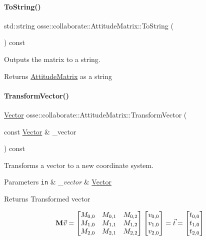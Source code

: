 \paragraph{\texorpdfstring{To\+String()}{ToString()}}
{\footnotesize\ttfamily std\+::string osse\+::collaborate\+::\+Attitude\+Matrix\+::\+To\+String (\begin{DoxyParamCaption}{ }\end{DoxyParamCaption}) const}



Outputs the matrix to a string. 

\begin{DoxyReturn}{Returns}
\hyperlink{classosse_1_1collaborate_1_1_attitude_matrix}{Attitude\+Matrix} as a string 
\end{DoxyReturn}
\mbox{\label{classosse_1_1collaborate_1_1_attitude_matrix_afc7bdadbaea2ac55fbec218ea17ce6a3}} 
\paragraph{\texorpdfstring{Transform\+Vector()}{TransformVector()}}
{\footnotesize\ttfamily \hyperlink{classosse_1_1collaborate_1_1_vector}{Vector} osse\+::collaborate\+::\+Attitude\+Matrix\+::\+Transform\+Vector (\begin{DoxyParamCaption}\item[{const \hyperlink{classosse_1_1collaborate_1_1_vector}{Vector} \&}]{\+\_\+vector }\end{DoxyParamCaption}) const\hspace{0.3cm}{\ttfamily [inline]}}



Transforms a vector to a new coordinate system. 


\begin{DoxyParams}[1]{Parameters}
\mbox{\tt in}  & {\em \+\_\+vector} & \hyperlink{classosse_1_1collaborate_1_1_vector}{Vector} \\
\hline
\end{DoxyParams}
\begin{DoxyReturn}{Returns}
Transformed vector
\end{DoxyReturn}
\[ {\bf M}\vec{v} = \begin{bmatrix} M_{0,0} & M_{0,1} & M_{0,2} \\ M_{1,0} & M_{1,1} & M_{1,2} \\ M_{2,0} & M_{2,1} & M_{2,2} \end{bmatrix} \begin{bmatrix} v_{0,0} \\ v_{1,0} \\ v_{2,0} \end{bmatrix} = \vec{t} = \begin{bmatrix} t_{0,0} \\ t_{1,0} \\ t_{2,0} \end{bmatrix} \] 

